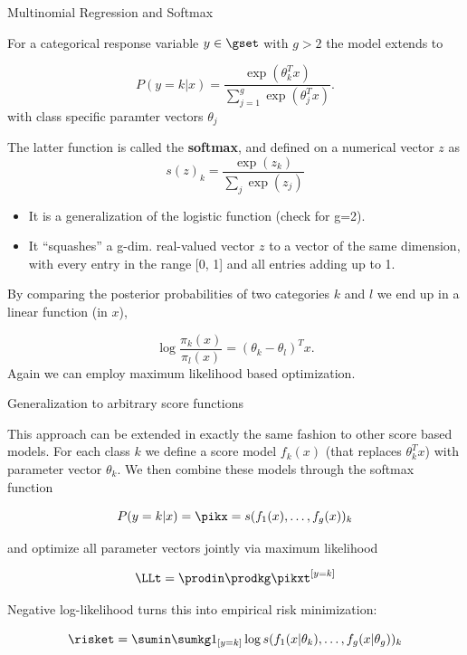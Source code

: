 
\begin{vbframe}{Multinomial Regression and Softmax}

For a categorical response variable $y \in \gset$ with $g>2$ the model extends to

$$
P(y = k | x) = \frac{\exp(\theta_k^Tx)}{\sum_{j=1}^g\exp(\theta_j^Tx)}.
$$
with class specific paramter vectors $\theta_j$

The latter function is called the \textbf{softmax}, and defined on a numerical vector $z$ as
$$
s(z)_k= \frac{\exp(z_k)}{\sum_{j}\exp(z_j)}
$$

\begin{itemize}
\item It is a generalization of the logistic function (check for g=2). \item It \enquote{squashes} a g-dim. real-valued vector $z$ to a vector of the same dimension,
with every entry in the range [0, 1] and all entries adding up to 1.
\end{itemize}
\framebreak

By comparing the posterior probabilities of two categories $k$ and $l$ we end up in a linear function (in $x$),

$$
\log\frac{\pi_k(x)}{\pi_l(x)} = (\theta_k-\theta_l)^Tx.
$$
Again we can employ maximum likelihood based optimization.

\end{vbframe}


\begin{frame}{Generalization to arbitrary score functions}

This approach can be extended in exactly the same fashion  to other score based models.
For each class $k$ we define a score model $f_k(x)$ (that replaces $\theta_k^Tx$) with parameter vector $\theta_k$.
We then combine these models through the softmax function

$$
P(y=k|x) = \pikx = s(f_1(x), \ldots, f_g(x))_k
$$

and optimize all parameter vectors 
jointly via maximum likelihood

$$
\LLt = \prodin \prodkg \pikxt^{[y = k]}
$$

Negative log-likelihood turns this into empirical risk minimization:

$$
\risket = \sumin \sumkg 1_{[y = k]} \log 
s(f_1(x | \theta_k), \ldots, f_g(x | \theta_g))_k
$$
\end{frame}


